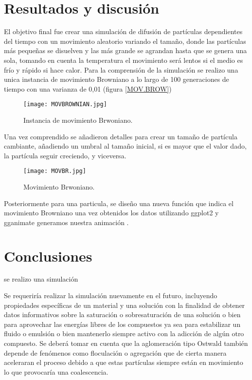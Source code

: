 \documentclass[3pt,twocolumn]{elsarticle}
\begin{document}
\section{Resultados y discusi\'on}
El objetivo final fue crear una simulación de difusión de partículas dependientes del tiempo con un movimiento aleatorio variando el tamaño, donde las partículas más pequeñas se disuelven y las más grande se agrandan hasta que se genera una sola, tomando en cuenta la temperatura el movimiento será lentos si el medio es frío y rápido si hace calor.
Para la comprensión de la simulación se realizo una unica instancia de movimiento Browniano a lo largo de 100 generaciones de tiempo con una varianza de 0,01 (figura \ref{MOV.BROW})

	\begin{figure}[h!]
				\centering
				\texttt{[image: MOVBROWNIAN.jpg]} %
				\caption{Instancia de movimiento Brwoniano.}
		\label{MOV.BROWNIAN}
\end{figure}

Una vez comprendido se añadieron detalles para crear un tamaño de partícula cambiante, añadiendo un umbral al tamaño inicial, si es mayor que el valor dado, la partícula seguir creciendo, y viceversa.

	\begin{figure}[h!]
				\centering
				\texttt{[image: MOVBR.jpg]} %
				\caption{Movimiento Brwoniano.}
		\label{MOV.BROWNIAN}
\end{figure}
Posteriormente para una particula, se diseño una nueva función que indica el movimiento Browniano una vez obtenidos los datos utilizando ggplot2 y gganimate generamos nuestra animación \cite{animacion}.
\section{Conclusiones}
se realizo una simulación 

Se requeriría realizar la simulación nuevamente en el futuro, incluyendo propiedades específicas de un material y una solución con la finalidad de obtener datos informativos sobre la saturación o sobresaturación de una solución o bien para aprovechar las energías libres de los compuestos ya sea para estabilizar un fluido o emulsión o bien mantenerlo siempre activo con la adicción de algún otro compuesto.
Se deberá tomar en cuenta que la aglomeración tipo Ostwald también depende de fenómenos como floculación o agregación que de cierta manera aceleraran el proceso debido a que estas partículas siempre están en movimiento lo que provocaría una coalescencia.
\end{document}
